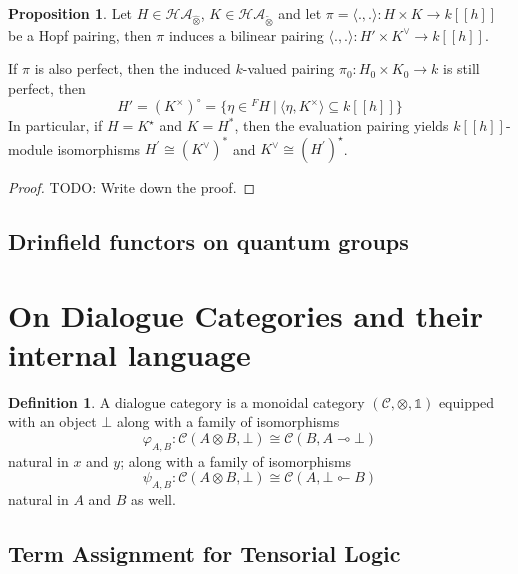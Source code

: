 \documentclass[8pt]{article}
\theoremstyle{definition}
\newtheorem{definition}{Definition}[section]
\theoremstyle{definition}
\theoremstyle{definition}
\theoremstyle{definition}
\theoremstyle{definition}
\theoremstyle{definition}
\theoremstyle{definition}
\newtheorem{prop}{Proposition}[section]
\theoremstyle{definition}
\theoremstyle{definition}
\theoremstyle{definition}
\theoremstyle{definition}
\theoremstyle{definition}
\theoremstyle{definition}
\theoremstyle{definition}
\theoremstyle{question}
\newcommand{\tildetimes}[0]{\widetilde{\otimes}}
\begin{document}
\begin{prop}
  Let $H \in \mathcal{HA}_{\widehat{\otimes}}$, $K \in \mathcal{HA}_{\tildetimes}$ and let 
  $\pi = \langle . , . \rangle : H \times K \to k[[h]]$ be a Hopf pairing, then 
  $\pi$ induces a bilinear pairing $\langle . , . \rangle : H' \times K^{\vee} \to k[[h]]$.

  If $\pi$ is also perfect, then the induced $k$-valued pairing $\pi_0 : H_0 \times K_0 \to k$
  is still perfect, then
  \[
  H' = (K^{\times})^{\circ} = \{ \eta \in {}^F H \: | \: \langle \eta, K^{\times} \rangle \subseteq k[[h]] \}
  \]
  In particular, if $H = K^{\star}$ and $K = H^*$, then the evaluation pairing yields
  $k[[h]]$-module isomorphisms $H^{'} \cong (K^{\vee})^*$ and $K^{\vee} \cong (H^{'})^{\star}$.
\end{prop}

\begin{proof}
  TODO: Write down the proof.
\end{proof}

\subsection{Drinfield functors on quantum groups}

\section{On Dialogue Categories and their internal language}
\begin{definition}
  A dialogue category is a monoidal category $(\mathcal{C}, \otimes, \mathds{1})$ equipped with an object $\bot$ along with a family
  of isomorphisms
  \[
  \varphi_{A,B} : \mathcal{C}(A \otimes B, \bot) \cong \mathcal{C}(B, A \multimap \bot)
  \]
  natural in $x$ and $y$; along with a family of isomorphisms
  \[
  \psi_{A, B} : \mathcal{C}(A \otimes B, \bot) \cong \mathcal{C}(A, \bot \multimapinv B)
  \]
  natural in $A$ and $B$ as well.
\end{definition}

\subsection{Term Assignment for Tensorial Logic}
\end{document}
